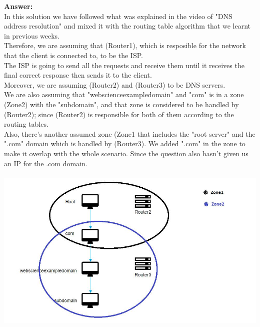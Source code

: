 \documentclass{WeSTassignment}
\begin{document}
\textbf{Answer:} \\
In this solution we have followed what was explained in the video of "DNS address resolution" and mixed it with the routing table algorithm that we learnt in previous weeks. \\
Therefore, we are assuming that (Router1), which is resposible for the network that the client is connected to, to be the ISP. \\
The ISP is going to send all the requests and receive them until it receives the final correct response then sends it to the client. \\ 
Moreover, we are assuming (Router2) and (Router3) to be DNS servers. \\
We are also assuming that "webscienceexampledomain" and "com" is in a zone (Zone2) with the "subdomain", and that zone is considered to be handled by (Router2); since (Router2) is responsible for both of them according to the routing tables. \\
Also, there's another assumed zone (Zone1 that includes the "root server" and the ".com" domain which is handled by (Router3). We added ".com" in the zone to make it overlap with the whole scenario. Since the question also hasn't given us an IP for the .com domain. \\ \\

\includegraphics[width=1\textwidth]{images/zones-dns.png} \\ \\ \\
\end{document}
